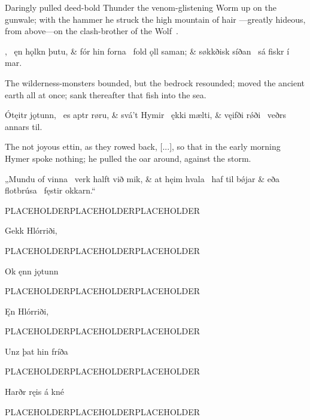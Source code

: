 \bvb Daringly pulled deed-bold Thunder the venom-glistening Worm up on the gunwale; with the hammer he struck the high mountain of hair —greatly hideous, from above—on the clash-brother of the Wolf .\evb
\evg


\bvg
\bva {} , \hld\ ęn hǫlkn þutu, &
fór hin forna \hld\ fold ǫll saman; &
søkkðisk síðan \hld\ sá fiskr í mar.\eva

\bvb The wilderness-monsters bounded, but the bedrock resounded; moved the ancient earth all at once; sank thereafter that fish  into the sea.\evb
\evg


\bvg
\bva Ótęitr jǫtunn, \hld\ es aptr røru, &
\skipnumbering{}
svá’t  Hymir \hld\ ękki mælti, &
vęifði rǿði \hld\ veðrs annars til.\eva

\bvb The not joyous ettin, as they rowed back, [...], so that in the early morning Hymer spoke nothing; he pulled the oar around, against the storm.\evb
\evg


\bvg
\bva „Mundu of vinna \hld\ verk halft við mik, &
at hęim hvala \hld\ haf til bǿjar &
eða flotbrúsa \hld\ fęstir okkarn.“\eva

\bvb PLACEHOLDERPLACEHOLDERPLACEHOLDER\evb
\evg


\bvg
\bva Gekk Hlórriði,\eva

\bvb PLACEHOLDERPLACEHOLDERPLACEHOLDER\evb
\evg


\bvg
\bva Ok ęnn jǫtunn\eva

\bvb PLACEHOLDERPLACEHOLDERPLACEHOLDER\evb
\evg


\bvg
\bva Ęn Hlórriði,\eva

\bvb PLACEHOLDERPLACEHOLDERPLACEHOLDER\evb
\evg


\bvg
\bva Unz þat hin fríða\eva

\bvb PLACEHOLDERPLACEHOLDERPLACEHOLDER\evb
\evg


\bvg
\bva Harðr ręis á kné\eva

\bvb PLACEHOLDERPLACEHOLDERPLACEHOLDER\evb
\evg



